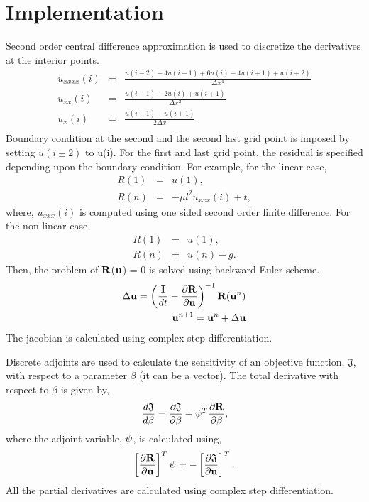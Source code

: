 \documentclass[%
notitlepage,
]{revtex4-1}
\newcommand{\be}{\ensuremath{{\beta}}\xspace}
\newcommand{\mat}[1]{{\ensuremath{\bf{ #1}}}}
\begin{document}
\section{Implementation}
Second order central difference approximation is used to discretize the derivatives at the interior points. 
\begin{eqnarray}
  u_{xxxx}(i) &=& \frac{u(i-2) - 4u(i-1) + 6u(i) - 4u(i+1) + u(i+2)}{\Delta x^4}\\
  u_{xx}(i) &=& \frac{u(i-1) - 2u(i) + u(i+1)}{\Delta x^2}\\
  u_{x}(i) &=& \frac{u(i-1) - u(i+1)}{2\Delta x}\\
\end{eqnarray}
Boundary condition at the second and the second last grid point is imposed by setting $u(i \pm 2)$ to u(i). For the first and last grid point, the residual is specified depending upon the boundary condition. For example, for the linear case,
\begin{eqnarray}
  R(1) &=& u(1),\\
  R(n) &=& - \mu l^2 u_{xxx}(i) + t, 
\end{eqnarray}
where, $u_{xxx}(i)$ is computed using one sided second order finite difference. For the non linear case, 
\begin{eqnarray}
  R(1) &=& u(1),\\
  R(n) &=& u(n) - g. 
\end{eqnarray}
Then, the problem of \mat{R}(\mat{u}) = 0 is solved using backward Euler scheme.
\begin{eqnarray}
  \Delta \mat{u} = \left(\frac{\mathbb{\mat{I}}}{dt} - \frac{ \partial \mat{R}}{ \partial \mat{u}}\right)^{-1} \mat{R}(\mat{u}^{n})\\
  \mat{u}^{n+1} = \mat{u}^{n} +  \Delta \mat{u}\\
\end{eqnarray}
The jacobian is calculated using complex step differentiation. 

Discrete adjoints are used to calculate the sensitivity of an objective function, $\mathfrak{J}$, with respect to a parameter $\be$ (it can be a vector). The total derivative with respect to \be is given by,
\begin{eqnarray}
\frac{d \mathfrak{J}}{d\be} =  \frac{\partial\mathfrak{J}}{\partial \be} + \mat{\psi}^T\frac{\partial \mat{R}}{ \partial \be},
\label{eq:appendix:1}
\end{eqnarray}
where the adjoint variable, $\mat{\psi}$, is calculated using,
\begin{eqnarray}
\left[\frac{\partial \mat{R}}{\partial \mat{{u}}}\right]^T \mat{\psi} = -\left[\frac{\partial \mathfrak{J}}{\partial \mat{{u}}}\right]^T.
\label{eq:appendix:2}
\end{eqnarray}
All the partial derivatives are calculated using complex step differentiation.
  
\end{document}
